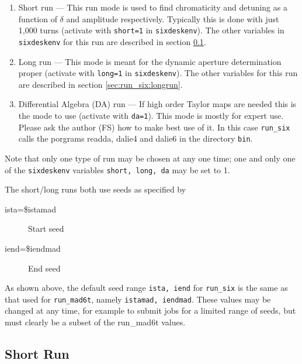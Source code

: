 \documentclass{cernatsnote}    %
\begin{document}
\begin{enumerate}
\item Short run ---
  This run mode is used to find chromaticity and detuning as a
  function of $\delta$ and amplitude respectively. Typically this is
  done with just 1,000 turns (activate with {\tt short=1} in {\tt sixdeskenv}).
  The other variables in {\tt sixdeskenv} for this run are described in 
  section \ref{sec:run_six:shortrun}.
\item Long run ---
  This mode is meant for the dynamic aperture determination
  proper (activate with {\tt long=1} in {\tt sixdeskenv}).
  The other variables for this run are described in section \ref{sec:run_six:longrun}.
\item Differential Algebra (DA) run ---
  If high order Taylor maps are needed this is the mode to use
  (activate with {\tt da=1}). This mode is mostly for expert use. 
  Please ask the author (FS) how to make best use of it.
  In this case {\tt run\_six} calls the porgrams readda, dalie4 and dalie6
  in the directory {\tt bin}.  
\end{enumerate}

Note that only one type of run may be chosen at any one time; one and only
one of the {\tt sixdeskenv} variables {\tt short, long, da} may be set to 1.

The short/long runs both use seeds as specified by
\begin{description}
\item[ista=\$istamad] Start seed
\item[iend=\$iendmad] End seed
\end{description}
As shown above, the default seed range {\tt ista, iend} for {\tt run\_six} is 
the same as that used for {\tt run\_mad6t}, namely {\tt istamad, iendmad}. 
These values may be changed at any time, for example to submit jobs for a limited
range of seeds, but must clearly be a subset of the {run\_mad6t} values.

\subsection{Short Run}
\label{sec:run_six:shortrun}
\end{document}
